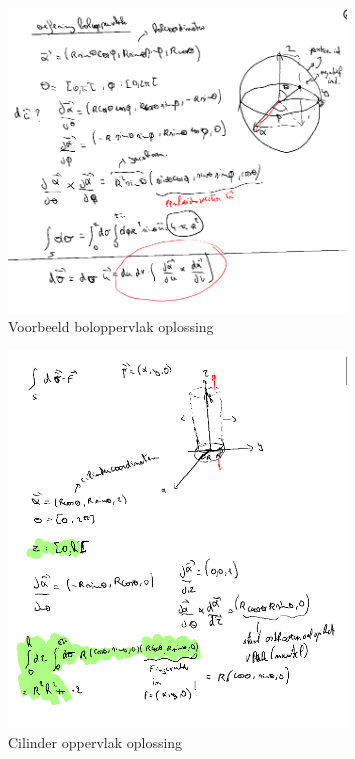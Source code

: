 \documentclass[a4paper]{article}
\begin{document}
\begin{figure}[H]
	\centering
	\includegraphics[width=0.8\textwidth]{assets/voorbeeld_boloppervlak_oplossing.png}
	\caption{Voorbeeld boloppervlak oplossing}
	\label{fig:voorbeeld_boloppervlak_oplossing}
\end{figure}

\begin{figure}[H]
	\centering
	\includegraphics[width=0.8\textwidth]{assets/cilinder_oppervlak_oplossing.png}
	\caption{Cilinder oppervlak oplossing}
	\label{fig:cilinder_oppervlak_oplossing}
\end{figure}
\end{document}
